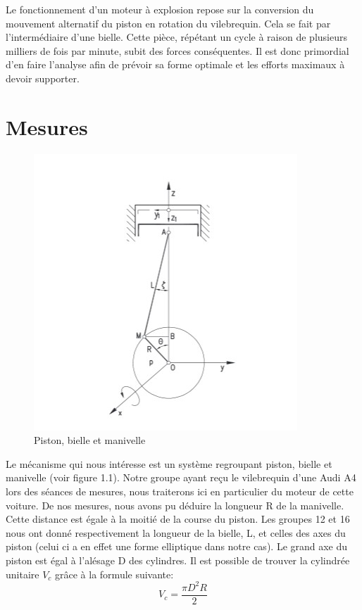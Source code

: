 \documentclass[a4paper,oneside,12pt]{report}
\begin{document}
Le fonctionnement d'un moteur à explosion repose sur la conversion du mouvement alternatif du piston en rotation du vilebrequin. Cela se fait par l'intermédiaire d'une bielle. Cette pièce, répétant un cycle à raison de plusieurs milliers de fois par minute, subit des forces conséquentes. Il est donc primordial d'en faire l'analyse afin de prévoir sa forme optimale et les efforts maximaux à devoir supporter. 

\section{Mesures}

\begin{figure}	
	\center
	\includegraphics[scale=0.7]{Dessin.jpg}
	\caption{Piston, bielle et manivelle}
\end{figure}

Le mécanisme qui nous intéresse est un système regroupant piston, bielle et manivelle (voir figure 1.1). Notre groupe ayant reçu le vilebrequin d'une Audi A4 lors des séances de mesures, nous traiterons ici en particulier du moteur de cette voiture. De nos mesures, nous avons pu déduire la longueur R de la manivelle. Cette distance est égale à la moitié de la course du piston. Les groupes 12 et 16 nous ont donné respectivement la longueur de la bielle, L, et celles des axes du piston (celui ci a en effet une forme elliptique dans notre cas). Le grand axe du piston est égal à l'alésage D des cylindres. Il est possible de trouver la cylindrée unitaire $V_c$ grâce à la formule suivante: 
$$V_c =\frac{\pi D^2 R}{2}$$
\end{document}
